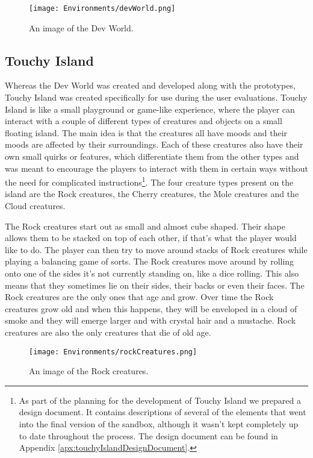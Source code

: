 \begin{figure}[h]
\centering
\texttt{[image: Environments/devWorld.png]}
\caption{An image of the Dev World.}
\label{fig:devWorld}
\end{figure}

\subsection{Touchy Island}
\label{subsec:touchyIsland}
Whereas the Dev World was created and developed along with the prototypes, Touchy Island was created specifically for use during the user evaluations. Touchy Island is like a small playground or game-like experience, where the player can interact with a couple of different types of creatures and objects on a small floating island. The main idea is that the creatures all have moods and their moods are affected by their surroundings. Each of these creatures also have their own small quirks or features, which differentiate them from the other types and was meant to encourage the players to interact with them in certain ways without the need for complicated instructions\footnote{As part of the planning for the development of Touchy Island we prepared a design document. It contains descriptions of several of the elements that went into the final version of the sandbox, although it wasn't kept completely up to date throughout the process. The design document can be found in Appendix \ref{apx:touchyIslandDesignDocument}.}. The four creature types present on the island are the Rock creatures, the Cherry creatures, the Mole creatures and the Cloud creatures.

The Rock creatures start out as small and almost cube shaped. Their shape allows them to be stacked on top of each other, if that's what the player would like to do. The player can then try to move around stacks of Rock creatures while playing a balancing game of sorts. The Rock creatures move around by rolling onto one of the sides it's not currently standing on, like a dice rolling. This also means that they sometimes lie on their sides, their backs or even their faces. The Rock creatures are the only ones that age and grow. Over time the Rock creatures grow old and when this happens, they will be enveloped in a cloud of smoke and they will emerge larger and with crystal hair and a mustache. Rock creatures are also the only creatures that die of old age.

\begin{figure}[h]
\centering
\texttt{[image: Environments/rockCreatures.png]}
\caption{An image of the Rock creatures.}
\label{fig:rockCreatures}
\end{figure}

